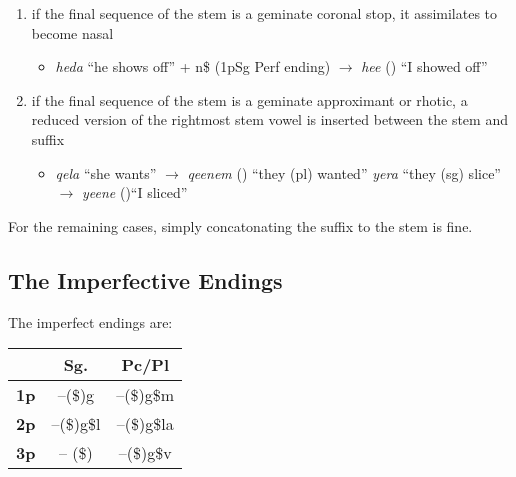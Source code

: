 \documentclass[oneside]{book}
\begin{document}
\begin{enumerate}
  \item if the final sequence of the stem is a geminate coronal stop, it assimilates to become nasal
  \begin{itemize}
    \item \begin{exe}
      \ex \textit{heda} ``he shows off'' + n\$ (1pSg Perf ending) $\rightarrow$ \textit{hee} () ``I showed off''
  \end{exe}



\end{itemize}

  \item if the final sequence of the stem is a geminate approximant or rhotic, a reduced version of the rightmost stem vowel is inserted between the stem and suffix
  \begin{itemize}
    \item \begin{exe}
      \ex \textit{qela} ``she wants''  $\rightarrow$ \textit{qeenem} () ``they (pl) wanted''
      \ex \textit{yera} ``they (sg) slice'' $\rightarrow$ \textit{yeene} ()``I sliced''
  \end{exe}
  \smallskip



\end{itemize}

\end{enumerate}
For the remaining cases, simply concatonating the suffix to the stem is fine.

\subsection{The Imperfective Endings}
The imperfect endings are:

\begin{center}
  \begin{tabular}{c| c c  }
    & \textbf{Sg.} & \textbf{Pc/Pl} \\
    \hline
    \textbf{1p} & --(\$)g & --(\$)g\$m \\
    \textbf{2p} & --(\$)g\$l & --(\$)g\$la\\
    \textbf{3p} & -- (\$)\textipa{:} & --(\$)g\$v


  \end{tabular}

\end{center}
\end{document}
